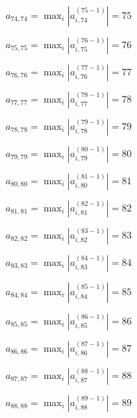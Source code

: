\documentclass[a4paper,12pt]{article}
\begin{document}
$a _{ 74, 74 } =  \max _i |a _{ i, 74 } ^{ (75 - 1) } | = 75$

$a _{ 75, 75 } =  \max _i |a _{ i, 75 } ^{ (76 - 1) } | = 76$

$a _{ 76, 76 } =  \max _i |a _{ i, 76 } ^{ (77 - 1) } | = 77$

$a _{ 77, 77 } =  \max _i |a _{ i, 77 } ^{ (78 - 1) } | = 78$

$a _{ 78, 78 } =  \max _i |a _{ i, 78 } ^{ (79 - 1) } | = 79$

$a _{ 79, 79 } =  \max _i |a _{ i, 79 } ^{ (80 - 1) } | = 80$

$a _{ 80, 80 } =  \max _i |a _{ i, 80 } ^{ (81 - 1) } | = 81$

$a _{ 81, 81 } =  \max _i |a _{ i, 81 } ^{ (82 - 1) } | = 82$

$a _{ 82, 82 } =  \max _i |a _{ i, 82 } ^{ (83 - 1) } | = 83$

$a _{ 83, 83 } =  \max _i |a _{ i, 83 } ^{ (84 - 1) } | = 84$

$a _{ 84, 84 } =  \max _i |a _{ i, 84 } ^{ (85 - 1) } | = 85$

$a _{ 85, 85 } =  \max _i |a _{ i, 85 } ^{ (86 - 1) } | = 86$

$a _{ 86, 86 } =  \max _i |a _{ i, 86 } ^{ (87 - 1) } | = 87$

$a _{ 87, 87 } =  \max _i |a _{ i, 87 } ^{ (88 - 1) } | = 88$

$a _{ 88, 88 } =  \max _i |a _{ i, 88 } ^{ (89 - 1) } | = 89$
\end{document}
